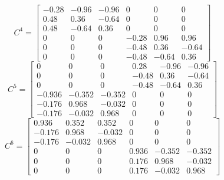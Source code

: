 \documentclass[a4paper, 12pt,fleqn]{extarticle}
\begin{document}
\[C^4=
\begin{bmatrix}
    -0.28 & -0.96 & -0.96 & 0 & 0 & 0\\
    0.48 & 0.36 & -0.64 & 0 & 0 & 0\\
    0.48 & -0.64 & 0.36 & 0 & 0 & 0\\
    0 & 0 & 0 & -0.28 & 0.96 & 0.96\\
    0 & 0 & 0 & -0.48 & 0.36 & -0.64\\
    0 & 0 & 0 & -0.48 & -0.64 & 0.36  
\end{bmatrix}\]
\[C^5=\begin{bmatrix}
    0 & 0 & 0 & 0.28 & -0.96 & -0.96\\
    0 & 0 & 0 & -0.48 & 0.36 & -0.64\\
    0 & 0 & 0 & -0.48 & -0.64 & 0.36\\
    -0.936 & -0.352 & -0.352 & 0 & 0 & 0\\
    -0.176 & 0.968 & -0.032 & 0 & 0 & 0\\
    -0.176 & -0.032 & 0.968 & 0 & 0 & 0 
\end{bmatrix}\]
\[C^6=
\begin{bmatrix}
    0.936 & 0.352 & 0.352 & 0 & 0 & 0\\
-0.176 & 0.968 & -0.032 & 0 & 0 & 0\\
-0.176 & -0.032 & 0.968 & 0 & 0 & 0\\
0 & 0 & 0 & 0.936 & -0.352 & -0.352\\
0 & 0 & 0 & 0.176 & 0.968 & -0.032\\
0 & 0 & 0 & 0.176 & -0.032 & 0.968
\end{bmatrix}\]
\end{document}
